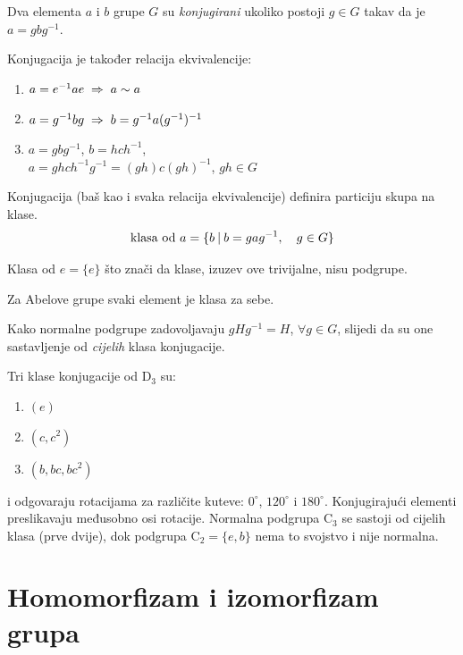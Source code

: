 \begin{definicija}
Dva elementa $a$ i $b$ grupe $G$ su \emph{konjugirani} ukoliko
postoji $g\in G$ takav da je $a=gbg^{-1}$.
\label{tm:konjugacija}
\end{definicija}

Konjugacija je također relacija ekvivalencije:
\begin{enumerate}
\item $a=e^{-1} a e  \;\Rightarrow\; a\sim a$
\item $a=g^{-1} b g  \;\Rightarrow\;  b= g^{-1} a (g^{-1})^{-1}$
\item $a=g b g^{-1}$, $b=hch^{-1}$, \\
         $a=ghch^{-1}g^{-1}=(gh)c(gh)^{-1}$, $gh\in G$
  
\end{enumerate}


Konjugacija (baš kao i svaka relacija ekvivalencije) definira
particiju skupa na klase.
\begin{displaymath}
   \text{klasa od $a$} = \{ b \: | \: b=gag^{-1},\quad g\in G\}
\end{displaymath}

Klasa od $e=\{e\}$ što znači da klase, izuzev ove trivijalne, nisu podgrupe.

Za Abelove grupe svaki element je klasa za sebe.

Kako normalne podgrupe zadovoljavaju $gHg^{-1}=H$, $\forall g\in G$, slijedi
da su one sastavljenje od \emph{cijelih} klasa konjugacije.

\begin{primjer} \label{pr:klaseD3}
Tri klase konjugacije  od D$_3$ su:
\begin{enumerate}
\item $(e)$
\item $(c, c^{2})$
\item $(b, bc, bc^2)$
\end{enumerate}
i odgovaraju rotacijama za različite kuteve: $0^\circ$, $120^\circ$ i
$180^\circ$. Konjugirajući elementi
preslikavaju međusobno osi rotacije. Normalna podgrupa $\mathrm{C}_3$ se
sastoji od cijelih klasa (prve dvije), dok podgrupa $\mathrm{C}_2=\{e,b\}$ nema
to svojstvo i nije normalna.
\end{primjer}

\section{Homomorfizam i izomorfizam grupa}

